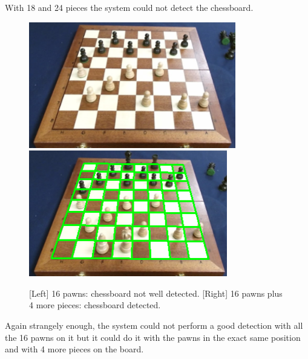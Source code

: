 \documentclass{l4proj}
\begin{document}
With 18 and 24 pieces the system could not detect the chessboard.


\begin{figure}[h!]
\includegraphics[scale=0.75]{tb6.png} \includegraphics[scale=0.75]{1tb7.png}
\caption{[Left] 16 pawns: chessboard not well detected. [Right] 16 pawns plus 4 more pieces: chessboard detected.}
\label{tb67}
\end{figure}

Again strangely enough, the system could not perform a good detection with all the 16 pawns on it but it could do it with the pawns in the exact same position and with 4 more pieces on the board.
\end{document}
